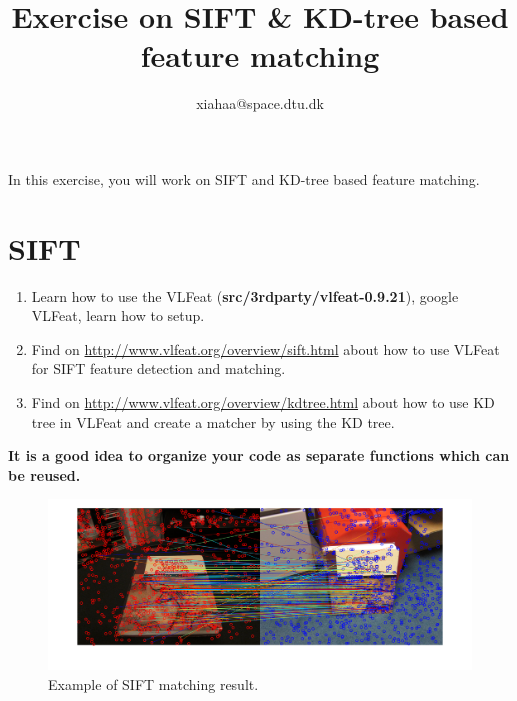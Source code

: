 \documentclass[a4paper]{article}
\begin{document}
\title{Exercise on SIFT \& KD-tree based feature matching}
\author{xiahaa@space.dtu.dk}
\maketitle%

In this exercise, you will work on SIFT and KD-tree based feature matching.

\section{SIFT}
\begin{enumerate}
\item Learn how to use the VLFeat (\textbf{src/3rdparty/vlfeat-0.9.21}), google VLFeat, learn how to setup.
\item Find on \url{http://www.vlfeat.org/overview/sift.html} about how to use VLFeat for SIFT feature detection and matching.
\item Find on \url{http://www.vlfeat.org/overview/kdtree.html} about how to use KD tree in VLFeat and create a matcher by using the KD tree.
\end{enumerate}

\textbf{It is a good idea to organize your code as separate functions which can be reused.}

\begin{figure}[!b]
\centering
\includegraphics[scale=0.3]{figures/sift.png}
\caption{Example of SIFT matching result.}
\end{figure}
\end{document}
